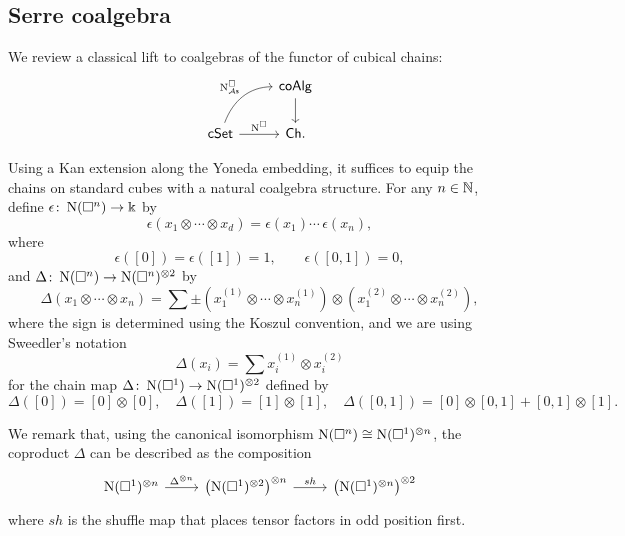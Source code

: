 \subsection{Serre coalgebra} \label{ss:serre coalgebra}

We review a classical lift to coalgebras of the functor of cubical chains:
\begin{equation*}
\begin{tikzcd}
& \coAlg \arrow[d] \\
\cSet \arrow[r, "\cchains"] \arrow[ur, "\cchainsAS", out=70, in=180] & \Ch.
\end{tikzcd}
\end{equation*}

Using a Kan extension along the Yoneda embedding, it suffices to equip the chains on standard cubes with a natural coalgebra structure.
For any $n \in \mathbb{N}$, define $\epsilon \colon \operatorname{N}(\square^n) \to \Bbbk$ by
\begin{equation*}
\epsilon \left( x_1 \otimes \cdots \otimes x_d \right) = \epsilon(x_1) \cdots \, \epsilon(x_n),
\end{equation*}
where
\begin{equation*}
\epsilon([0]) = \epsilon([1]) = 1, \qquad \epsilon([0, 1]) = 0,
\end{equation*} 
and $\Delta \colon \operatorname{N}(\square^n) \to \operatorname{N}(\square^n)^{\otimes 2}$ by
\begin{equation*}	
\Delta (x_1 \otimes \cdots \otimes x_n) = 	
\sum \pm \left( x_1^{(1)} \otimes \cdots \otimes x_n^{(1)} \right) \otimes 	
\left( x_1^{(2)} \otimes \cdots \otimes x_n^{(2)} \right),	
\end{equation*}	
where the sign is determined using the Koszul convention, and we are using Sweedler's notation
\begin{equation*}	
\Delta(x_i) = \sum x_i^{(1)} \otimes x_i^{(2)}
\end{equation*}
for the chain map $\Delta \colon \operatorname{N}(\square^1) \to \operatorname{N}(\square^1)^{\otimes 2}$ defined by
\begin{equation*}
\Delta([0]) = [0] \otimes [0], \quad \Delta([1]) = [1] \otimes [1], \quad \Delta([0,1]) = [0] \otimes [0,1] + [0,1] \otimes [1].
\end{equation*}

We remark that, using the canonical isomorphism $\operatorname{N}(\square^n) \cong \operatorname{N}(\square^1)^{\otimes n}$, the coproduct $\Delta$ can be described as the composition
\begin{equation*}
\begin{tikzcd}
\chains(\cube^1)^{\otimes n} \arrow[r, "\Delta^{\otimes n}"] & \left( \chains(\cube^1)^{\otimes 2}  \right)^{\otimes n} \arrow[r, "sh"] & \left( \chains(\cube^1)^{\otimes n} \right)^{\otimes 2}
\end{tikzcd}
\end{equation*}
where $sh$ is the shuffle map that places tensor factors in odd position first. \vspace*{5pt} \\

